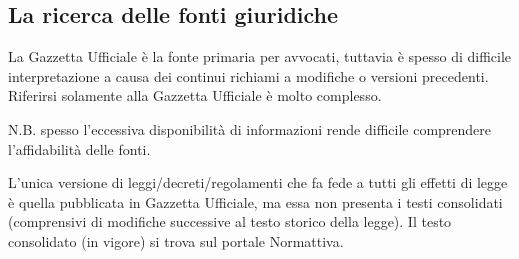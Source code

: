 
\subsection{La ricerca delle fonti giuridiche}
La Gazzetta Ufficiale è la fonte primaria per avvocati, tuttavia è spesso di difficile interpretazione a causa dei continui richiami a modifiche o versioni precedenti. Riferirsi solamente alla Gazzetta Ufficiale è molto complesso. 

N.B. spesso l'eccessiva disponibilità di informazioni rende difficile comprendere l'affidabilità delle fonti.

L'unica versione di leggi/decreti/regolamenti che fa fede a tutti gli effetti di legge è quella pubblicata in Gazzetta Ufficiale, ma essa non presenta i testi consolidati (comprensivi di modifiche successive al testo storico della legge). Il testo consolidato (in vigore) si trova sul portale Normattiva. 
